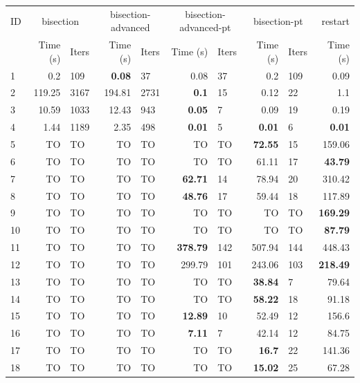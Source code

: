 \begin{longtable}{lr@{\hskip 4pt}l@{\hskip 12pt}r@{\hskip 4pt}l@{\hskip 12pt}r@{\hskip 4pt}l@{\hskip 12pt}r@{\hskip 4pt}l@{\hskip 12pt}r}
\toprule
ID & \multicolumn{2}{c}{bisection} & \multicolumn{2}{c}{bisection-advanced} & \multicolumn{2}{c}{bisection-advanced-pt} & \multicolumn{2}{c}{bisection-pt} & restart \\
\cmidrule(lr){2-3}\cmidrule(lr){4-5}\cmidrule(lr){6-7}\cmidrule(lr){8-9}\cmidrule(lr){10-10}
 & Time (s) &  Iters & Time (s) &  Iters & Time (s) &  Iters & Time (s) &  Iters & Time (s) \\
\midrule
\endhead
1 & 0.2 & 109 & \textbf{0.08} & 37 & 0.08 & 37 & 0.2 & 109 & 0.09 \\
2 & 119.25 & 3167 & 194.81 & 2731 & \textbf{0.1} & 15 & 0.12 & 22 & 1.1 \\
\cmidrule{2-10}
3 & 10.59 & 1033 & 12.43 & 943 & \textbf{0.05} & 7 & 0.09 & 19 & 0.19 \\
4 & 1.44 & 1189 & 2.35 & 498 & \textbf{0.01} & 5 & \textbf{0.01} & 6 & \textbf{0.01} \\
\midrule
5 & TO & TO & TO & TO & TO & TO & \textbf{72.55} & 15 & 159.06 \\
6 & TO & TO & TO & TO & TO & TO & 61.11 & 17 & \textbf{43.79} \\
7 & TO & TO & TO & TO & \textbf{62.71} & 14 & 78.94 & 20 & 310.42 \\
8 & TO & TO & TO & TO & \textbf{48.76} & 17 & 59.44 & 18 & 117.89 \\
\cmidrule{2-10}
9 & TO & TO & TO & TO & TO & TO & TO & TO & \textbf{169.29} \\
10 & TO & TO & TO & TO & TO & TO & TO & TO & \textbf{87.79} \\
11 & TO & TO & TO & TO & \textbf{378.79} & 142 & 507.94 & 144 & 448.43 \\
12 & TO & TO & TO & TO & 299.79 & 101 & 243.06 & 103 & \textbf{218.49} \\
\cmidrule{2-10}
13 & TO & TO & TO & TO & TO & TO & \textbf{38.84} & 7 & 79.64 \\
14 & TO & TO & TO & TO & TO & TO & \textbf{58.22} & 18 & 91.18 \\
15 & TO & TO & TO & TO & \textbf{12.89} & 10 & 52.49 & 12 & 156.6 \\
16 & TO & TO & TO & TO & \textbf{7.11} & 7 & 42.14 & 12 & 84.75 \\
\cmidrule{2-10}
17 & TO & TO & TO & TO & TO & TO & \textbf{16.7} & 22 & 141.36 \\
18 & TO & TO & TO & TO & TO & TO & \textbf{15.02} & 25 & 67.28 \\

\end{longtable}
